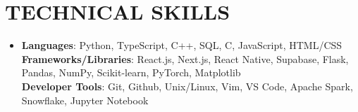 \documentclass[letterpaper,11pt]{article}
\begin{document}
    \section{\textbf{TECHNICAL SKILLS}}
 \begin{itemize}[leftmargin=0in, label={}]
    \item{
        \textbf{Languages}{: \small{Python, TypeScript, C++, SQL, C, JavaScript, HTML/CSS}} \\
        \vspace{1pt}
        \textbf{Frameworks/Libraries}{: \small{React.js, Next.js, React Native, Supabase, Flask, Pandas, NumPy, Scikit-learn, PyTorch, Matplotlib}} \\
        \vspace{1pt}
        \textbf{Developer Tools}{: \small{Git, Github, Unix/Linux, Vim, VS Code, Apache Spark, Snowflake, Jupyter Notebook}} \\
        \vspace{1pt}
    }
 \end{itemize}
\end{document}
